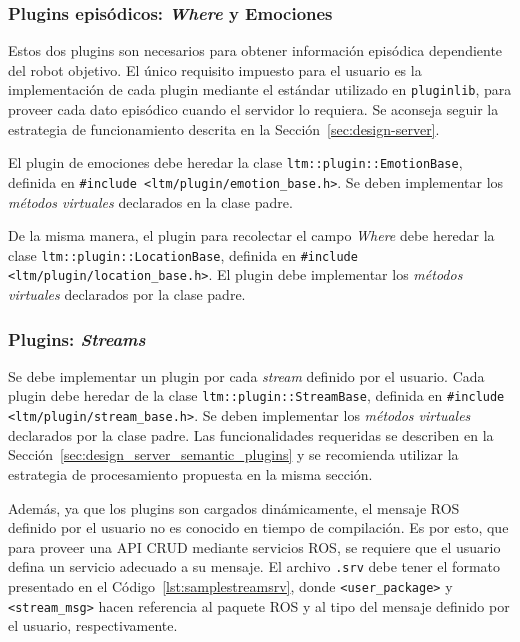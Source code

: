 \subsubsection{Plugins episódicos: \textit{Where} y Emociones}

Estos dos plugins son necesarios para obtener información episódica dependiente del robot objetivo. El único requisito impuesto para el usuario es la implementación de cada plugin mediante el estándar utilizado en \texttt{pluginlib}, para proveer cada dato episódico cuando el servidor lo requiera. Se aconseja seguir la estrategia de funcionamiento descrita en la Sección~\ref{sec:design-server}.

El plugin de emociones debe heredar la clase \texttt{ltm::plugin::EmotionBase}, definida en \texttt{\#include \textless ltm/plugin/emotion\_base.h\textgreater}. Se deben implementar los \textit{métodos virtuales} declarados en la clase padre.

De la misma manera, el plugin para recolectar el campo \textit{Where} debe heredar la clase \texttt{ltm::plugin::LocationBase}, definida en \texttt{\#include \textless ltm/plugin/location\_base.h\textgreater}. El plugin debe implementar los \textit{métodos virtuales} declarados por la clase padre.


\subsubsection{Plugins: \textit{Streams}}

Se debe implementar un plugin por cada \textit{stream} definido por el usuario. Cada plugin debe heredar de la clase \texttt{ltm::plugin::StreamBase}, definida en \texttt{\#include \textless ltm/plugin/stream\_base.h\textgreater}. Se deben implementar los \textit{métodos virtuales} declarados por la clase padre. Las funcionalidades requeridas se describen en la Sección~\ref{sec:design_server_semantic_plugins} y se recomienda utilizar la estrategia de procesamiento propuesta en la misma sección.

Además, ya que los plugins son cargados dinámicamente, el mensaje ROS definido por el usuario no es conocido en tiempo de compilación. Es por esto, que para proveer una API CRUD mediante servicios ROS, se requiere que el usuario defina un servicio adecuado a su mensaje. El archivo \texttt{.srv} debe tener el formato presentado en el Código~\ref{lst:samplestreamsrv}, donde \texttt{\textless user\_package\textgreater} y \texttt{\textless stream\_msg\textgreater} hacen referencia al paquete ROS y al tipo del mensaje definido por el usuario, respectivamente.
\lstset{style=/Style/ROS/MSG}


